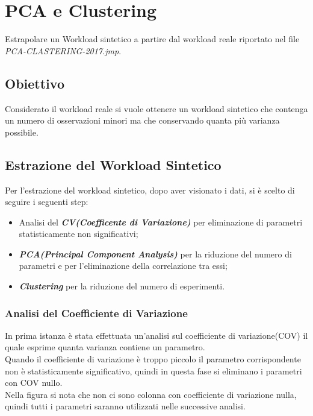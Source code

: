 
\chapter{PCA e Clustering}
Estrapolare un Workload sintetico a partire dal workload reale riportato nel file
 \textit{PCA-CLASTERING-2017.jmp}.

\section{Obiettivo}
Considerato il workload reale si vuole ottenere un workload sintetico
che contenga un numero di osservazioni minori ma che conservando quanta
più varianza possibile.

\section{Estrazione del Workload Sintetico}
Per l'estrazione del workload sintetico, dopo aver visionato i dati, si è scelto
di seguire i seguenti step:

\begin{itemize}
  \item Analisi del \textbf{\textit{CV(Coefficente di Variazione)}} per
  eliminazione di parametri statisticamente non significativi;
  \item \textbf{\textit{PCA(Principal Component Analysis)}} per la riduzione del
  numero di parametri e per l'eliminazione della correlazione tra essi;
  \item \textbf{\textit{Clustering}} per la riduzione del numero di esperimenti.
\end{itemize}


\subsection{Analisi del Coefficiente di Variazione}
In prima istanza è stata effettuata un'analisi sul coefficiente di variazione(COV)
il quale esprime quanta varianza contiene un parametro.\\
Quando il coefficiente di variazione è troppo piccolo il parametro corrispondente
non è statisticamente significativo, quindi in questa fase si eliminano i parametri
con COV nullo.\\
Nella figura si nota che non ci sono colonna con coefficiente di variazione nulla,
quindi tutti i parametri saranno utilizzati nelle successive analisi.

